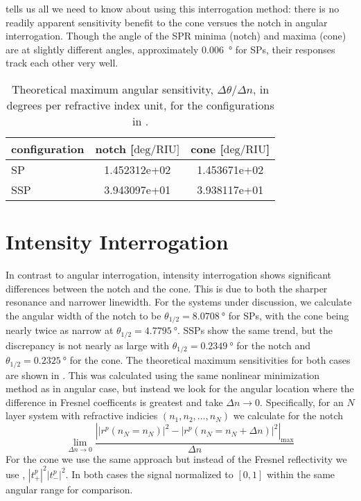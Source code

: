  tells us all we need to know about using this
interrogation method: there is no readily apparent sensitivity benefit to
the cone versues the notch in angular interrogation.  Though the angle of the
SPR minima (notch) and maxima (cone) are at slightly different angles, 
approximately \SI{0.006}{\degree} for SPs, their responses
track each other very well.  
\begin{table}[ht]
\centering
{}
\begin{tabular}{lSS}
\toprule
{configuration} & {notch [$\mathrm{deg}/\mathrm{RIU}]$} & {cone [$\mathrm{deg}/\mathrm{RIU}$]} \\
\midrule
SP & 1.452312e+02 & 1.453671e+02 \\
SSP & 3.943097e+01 & 3.938117e+01 \\
\bottomrule
\end{tabular}
\caption{Theoretical maximum angular sensitivity, $\Delta \theta/\Delta n$,
in degrees per refractive index unit, for the configurations in 
.}
\label{tbl:angularsens}
\end{table}

\section{Intensity Interrogation}
In contrast to angular interrogation, intensity interrogation shows
significant differences between the notch and the cone.  This is due to
both the sharper resonance and narrower linewidth.  For the systems under
discussion, we calculate the angular width of the notch to be
$\theta_{1/2}=\SI{8.0708}{\degree}$ for SPs, with the cone being nearly
twice as narrow at $\theta_{1/2}=\SI{4.7795}{\degree}$.  SSPs show the same
trend, but the discrepancy is not nearly as large with
$\theta_{1/2}=\SI{0.2349}{\degree}$ for the notch and
$\theta_{1/2}=\SI{0.2325}{\degree}$ for the cone.  The theoretical maximum
sensitivities for both cases are shown in .  This
was calculated using the same nonlinear minimization method as in angular
case, but instead we look for the angular location where the difference in Fresnel
coefficents is greatest and take $\Delta n \to 0$.  Specifically, for an
$N$ layer system with refractive indicies $(n_1,n_2, \ldots,n_N)$ we
calculate for the notch
\begin{equation}
								\lim_{\Delta n \to 0}\frac{\left||r^p(n_N=n_N)|^2 - |r^p(n_N=n_N + \Delta n)|^2\right|_\mathrm{max}}{\Delta n}
\label{eqn:fresnelsenspertrubation}
\end{equation}
For the cone we use the same approach but instead of the Fresnel
reflectivity we use , $|t^p_+|^2|t^p_-|^2$.  In
both cases the signal normalized to $[0,1]$ within the same angular range
for comparison.


